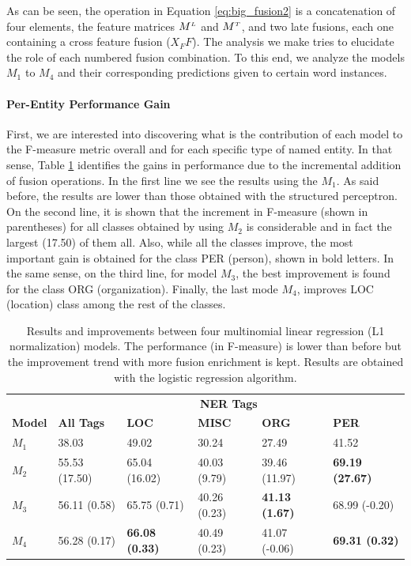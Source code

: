 As can be seen, the operation in Equation \ref{eq:big_fusion2} is a concatenation of four elements, the feature matrices $M^{\scriptscriptstyle L}$ and $M^{\scriptscriptstyle T}$, and two late fusions, each one containing a cross feature fusion ($X_FF$). The analysis we make tries to elucidate the role of each numbered fusion combination. To this end, we analyze the models $M_1$ to $M_4$ and their corresponding predictions given to certain word instances. 

\paragraph{Per-Entity Performance Gain}
First, we are interested into discovering what is the contribution of each model to  the F-measure metric overall and for each specific type of named entity. In that sense,  Table \ref{tab:4ops} identifies the gains in performance due to the incremental addition of  fusion operations. In the first line  we see the results using the $M_1$. As said before, the results are lower than those obtained with the structured perceptron. On the second line, it is shown that the increment in F-measure (shown in parentheses) for all classes obtained by using $M_2$ is considerable and in fact the largest (17.50) of them all. Also, while all the classes improve, the most important gain is obtained for the class PER (person), shown in bold letters. In the same sense, on the third line, for model $M_3$, the best improvement is found for the class ORG (organization). Finally, the last mode $M_4$, improves LOC (location) class among the rest of the classes.




\begin{table}[!ht]
\centering
\caption{Results and improvements between four multinomial linear regression (L1 normalization) models. The performance (in F-measure) is lower than before but the improvement trend with more fusion enrichment is kept. Results are obtained with the logistic regression algorithm.  }
\label{tab:4ops}
\begin{tabular}{@{}llllll@{}}
\toprule
& \multicolumn{5}{c}{\textbf{NER Tags}} \\ \cline{2-6}
 \textbf{Model} & \textbf{All Tags}           & \textbf{LOC}                   & \textbf{MISC}         & \textbf{ORG}                   & \textbf{PER}                    \\ \midrule
$M_1$ & 38.03         & 49.02                 & 30.24        & 27.49                 & 41.52                  \\
$M_2$ & 55.53 (17.50) & 65.04 (16.02)         & 40.03 (9.79) & 39.46 (11.97)         & \textbf{69.19 (27.67)} \\
$M_3$ & 56.11 (0.58)  & 65.75 (0.71)          & 40.26 (0.23) & \textbf{41.13 (1.67)} & 68.99 (-0.20)          \\
$M_4$& 56.28 (0.17)  & \textbf{66.08 (0.33)} & 40.49 (0.23) & 41.07 (-0.06)         & \textbf{69.31 (0.32)}           \\ \bottomrule
\end{tabular}
\end{table}

